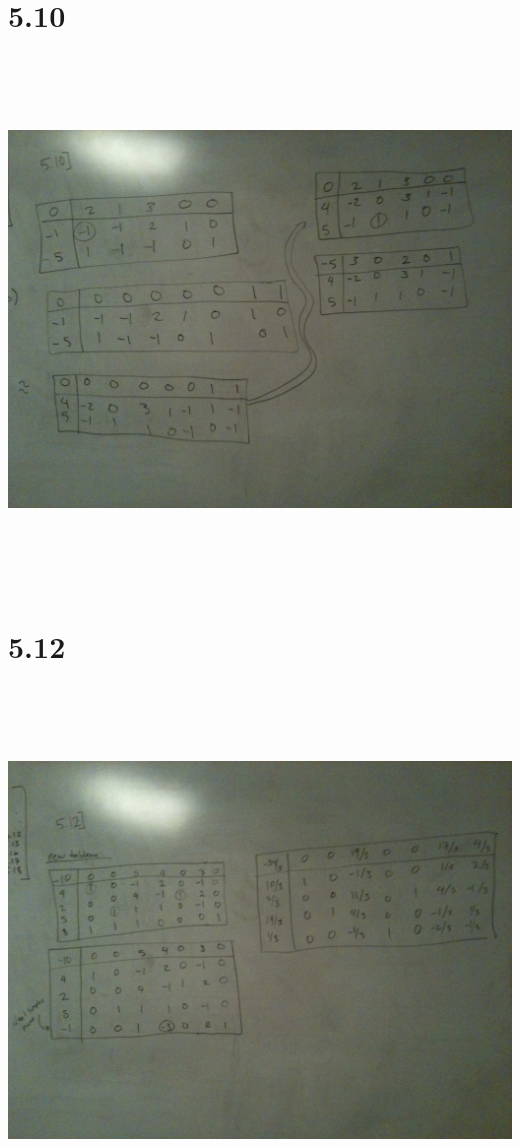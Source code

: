 \documentclass[a4paper,12pt]{article}
\begin{document}
\section*{5.10}
\includegraphics[width=14cm, height=14cm, keepaspectratio=true]{image/fiveten.jpg}
\section*{5.12}
\includegraphics[width=14cm, height=14cm, keepaspectratio=true]{image/fivetwelve.jpg}
\end{document}

